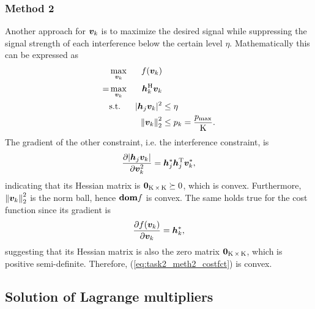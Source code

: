 \documentclass[10pt,a4paper]{article}
\begin{document}
\subsubsection*{Method 2}
Another approach for $\bm{v}_{k}$ is to maximize the desired signal while suppressing the signal strength of each interference below the certain level $\eta$. Mathematically this can be expressed as 
\begin{equation} \label{eq:task2_meth2_costfct}
\begin{aligned}
  &  \max_{\bm{v}_k} & f (\bm{v}_{k})  &\\
=  & \max_{\bm{v}_k} & \bm{h}_{k}^{\operatorname{H}} \bm{v}_k  & \\
  & \text{s.t.} & \vert \bm{h}_{j} \bm{v}_{k} \vert^{2}  & \leq \eta \\
  & & \left\lVert\bm{v}_{k}\right\rVert_{2}^{2} & \leq p_k = \frac{p_{\max}}{\operatorname{K}} .
\end{aligned}
\end{equation}
The gradient of the other constraint, i.e. the interference constraint, is
\begin{equation}
\frac{\partial \vert \bm{h}_{j} \bm{v}_{k} \vert}{\partial \bm{v}_{k}^{2}} = \bm{h}_{j}^{*} \bm{h}_{j}^{\operatorname{T}} \bm{v}_{k}^{*},  
\end{equation}
indicating that its Hessian matrix is $\bm{0}_{\operatorname{K} \times \operatorname{K}} \succeq 0$, which is convex. Furthermore, $\left\lVert\bm{v}_{k}\right\rVert_{2}^{2}$ is the norm ball, hence $\text{\bf dom} f$ is convex. The same holds true for the cost function since its gradient is 
\begin{equation}
\frac{\partial f (\bm{v}_{k})}{\partial \bm{v}_{k}} = \bm{h}_{k}^{*},
\end{equation}
suggesting that its Hessian matrix is also the zero matrix $\bm{0}_{\operatorname{K} \times \operatorname{K}}$, which is positive semi-definite. Therefore, (\ref{eq:task2_meth2_costfct}) is convex.

\subsection{Solution of Lagrange multipliers}
\end{document}
